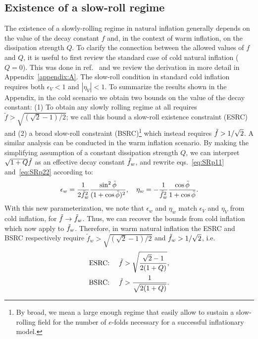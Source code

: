 \documentclass[a4paper,11pt]{article}
\begin{document}
\subsection{Existence of a slow-roll regime}
\label{sec:3.1.2}

The existence of a slowly-rolling regime in natural inflation generally depends on the value of the decay constant $f$ and, in the context of warm inflation, on the dissipation strength $Q$. To clarify the connection between the allowed values of $f$ and $Q$, it is useful to first review the standard case of cold natural inflation ($Q=0$). This was done in ref.~\cite{Freese:2004un} and we review the derivation in more detail in Appendix~\ref{appendix:A}.  
The slow-roll condition in standard cold inflation requires  both $\epsilon_V < 1$ and $|\eta_V| < 1$. 
To summarize the results shown in the Appendix, in the cold scenario we obtain two bounds on the value of the decay constant:
(1) To obtain any slowly rolling regime at all requires $\tilde{f}>\sqrt{(\sqrt{2}-1)/2}$; we call this bound a slow-roll existence constraint (ESRC) and (2) a broad slow-roll constraint (BSRC)\footnote{By broad, we mean a large enough regime that easily allow to sustain a slow-rolling field for the number of $e$-folds necessary for a successful inflationary model.} which instead requires $\Tilde{f}>1/\sqrt{2}$. A similar analysis can be conducted in the warm inflation scenario. By making the simplifying assumption of a constant dissipation strength $Q$, we can interpret $\sqrt{1+Q}\Tilde{f}$ as an effective decay constant $\Tilde{f}_w$, and rewrite eqs.~\eqref{eq:SRp11} and~\eqref{eq:SRp22} according to:
\begin{align}
\epsilon_{w}= \frac{1}{2\Tilde{f}_w^2}\frac{\sin ^{2} \Tilde{\phi}}{(1+\cos \Tilde{\phi})^{2}}, \quad
\eta_{w}=-\frac{1}{\Tilde{f}_w^2}  \frac{\cos\Tilde{\phi} }{1+\cos \Tilde{\phi}}.
\end{align}
With this new parameterization, we note that $\epsilon_w$ and $\eta_w$ match $\epsilon_V$ and $\eta_V$ from cold inflation, for $\Tilde{f} \to \Tilde{f}_w$. Thus, we can recover the bounds from cold inflation which now apply to $\Tilde{f}_w$. Therefore, in warm natural inflation
the ESRC and BSRC respectively require $\tilde{f}_w>\sqrt{(\sqrt{2}-1)/2}$ and $\Tilde{f}_w>1/\sqrt{2}$, i.e.
\begin{align}
    \text{ESRC: }\quad \Tilde{f}&>\sqrt{\frac{\sqrt{2}-1}{2(1+Q)}}, \label{eq:WI_SRc1}\\
    \text{BSRC: }\quad \Tilde{f}&>\frac{1}{\sqrt{2(1+Q)}}.  \label{eq:WI_SRc2}
\end{align} 
\end{document}

